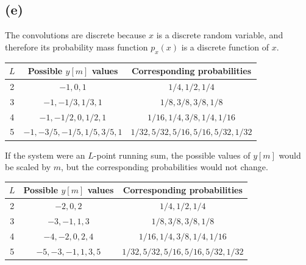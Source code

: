 \documentclass{article}
\begin{document}
\begin{center}
\end{center}

\subsection{(e)}

The convolutions are discrete because $x$ is a discrete random variable, and therefore its probability mass function $p_x(x)$ is a discrete function of $x$.

\begin{center}
	\begin{tabular}{c|c|c}
	$L$ & Possible $y[m]$  values & Corresponding probabilities \\
	\hline
	2 & $-1, 0, 1$ & $1/4, 1/2, 1/4$ \\
	3 & $-1, -1/3, 1/3, 1$ & $1/8, 3/8, 3/8, 1/8$ \\
	4 & $-1, -1/2, 0, 1/2, 1$ & $1/16, 1/4, 3/8, 1/4, 1/16$ \\
	5 & $-1, -3/5, -1/5, 1/5, 3/5, 1$ &  $1/32, 5/32, 5/16, 5/16, 5/32, 1/32$\\
	\hline
\end{tabular}
\end{center}

If the system were an $L$-point running sum, the possible values of $y[m]$ would be scaled by $m$, but the corresponding probabilities would not change.
\begin{center}
	\begin{tabular}{c|c|c}
		$L$ & Possible $y[m]$ values & Corresponding probabilities \\
		\hline
		2 & $-2, 0, 2$ & $1/4, 1/2, 1/4$ \\
		3 & $-3, -1, 1, 3$ & $1/8, 3/8, 3/8, 1/8$ \\
		4 & $-4, -2, 0, 2, 4$ & $1/16, 1/4, 3/8, 1/4, 1/16$ \\
		5 & $-5, -3, -1, 1, 3, 5$ &  $1/32, 5/32, 5/16, 5/16, 5/32, 1/32$ \\
		\hline
	\end{tabular}
\end{center}
\end{document}

